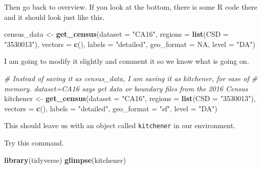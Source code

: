 \documentclass[
]{article}
\newenvironment{Shaded}{\begin{snugshade}}{\end{snugshade}}
\newcommand{\CommentTok}[1]{\textcolor[rgb]{0.56,0.35,0.01}{\textit{#1}}}
\newcommand{\DataTypeTok}[1]{\textcolor[rgb]{0.13,0.29,0.53}{#1}}
\newcommand{\KeywordTok}[1]{\textcolor[rgb]{0.13,0.29,0.53}{\textbf{#1}}}
\newcommand{\NormalTok}[1]{#1}
\newcommand{\OtherTok}[1]{\textcolor[rgb]{0.56,0.35,0.01}{#1}}
\newcommand{\StringTok}[1]{\textcolor[rgb]{0.31,0.60,0.02}{#1}}
\begin{document}
Then go back to overview. If you look at the bottom, there is some R
code there and it should look just like this.

\begin{Shaded}
\begin{Highlighting}[]
\NormalTok{census\_data <{-}}\StringTok{ }\KeywordTok{get\_census}\NormalTok{(}\DataTypeTok{dataset =} \StringTok{"CA16"}\NormalTok{, }\DataTypeTok{regions =} \KeywordTok{list}\NormalTok{(}\DataTypeTok{CSD =} \StringTok{"3530013"}\NormalTok{), }\DataTypeTok{vectors =} \KeywordTok{c}\NormalTok{(), }
    \DataTypeTok{labels =} \StringTok{"detailed"}\NormalTok{, }\DataTypeTok{geo\_format =} \OtherTok{NA}\NormalTok{, }\DataTypeTok{level =} \StringTok{"DA"}\NormalTok{)}
\end{Highlighting}
\end{Shaded}

I am going to modify it slightly and comment it so we know what is going
on.

\begin{Shaded}
\begin{Highlighting}[]
\CommentTok{\# Instead of saving it as census\_data, I am saving it as kitchener, for ease of}
\CommentTok{\# memory. dataset=CA16 says get data or boundary files from the 2016 Census}
\NormalTok{kitchener <{-}}\StringTok{ }\KeywordTok{get\_census}\NormalTok{(}\DataTypeTok{dataset =} \StringTok{"CA16"}\NormalTok{, }\DataTypeTok{regions =} \KeywordTok{list}\NormalTok{(}\DataTypeTok{CSD =} \StringTok{"3530013"}\NormalTok{), }\DataTypeTok{vectors =} \KeywordTok{c}\NormalTok{(), }
    \DataTypeTok{labels =} \StringTok{"detailed"}\NormalTok{, }\DataTypeTok{geo\_format =} \StringTok{"sf"}\NormalTok{, }\DataTypeTok{level =} \StringTok{"DA"}\NormalTok{)}
\end{Highlighting}
\end{Shaded}

This should leave us with an object called \texttt{kitchener} in our
environment.

Try this command.

\begin{Shaded}
\begin{Highlighting}[]
\KeywordTok{library}\NormalTok{(tidyverse)}
\KeywordTok{glimpse}\NormalTok{(kitchener)}
\end{Highlighting}
\end{Shaded}
\end{document}
